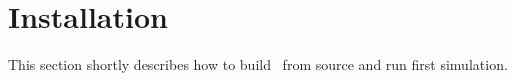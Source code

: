 \newpage
\section{Installation} 

This section shortly describes how to build \BornAgain\ from source and run first
simulation.
